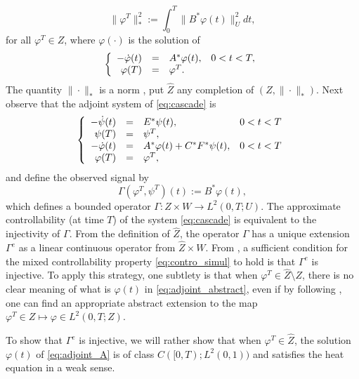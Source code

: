 \documentclass[10pt]{article}
\begin{document}
\begin{equation}\label{eq:obs_norm}
\|\varphi^T\|_*^2 := \int_0^T \|B^*\varphi(t) \|_U^2 dt,
\end{equation}
for all $\varphi^T \in Z$, where $\varphi(\cdot)$ is the solution of 
\begin{equation}\label{eq:adjoint_A}
\left\lbrace \begin{array}{rcl c}
- \dot{\varphi}(t) &=& A^* \varphi(t), & 0 < t < T,\\
\varphi(T) &=& \varphi^T.
\end{array}\right.
\end{equation}
The quantity $\| \cdot \|_*$ is a norm \cite[\S 2.3.2]{Coron}, put $\hat{Z}$ any completion of $(Z,\|\cdot\|_*)$. Next observe that the adjoint system of \eqref{eq:cascade} is
\begin{equation}\label{eq:adjoint_abstract}
\left\lbrace \begin{array}{rcl c}
- \dot{\psi}(t) &=& E^*\psi(t),& 0 < t < T \\
\psi(T) &=& \psi^T, \\
-\dot{\varphi}(t) &=& A^*\varphi(t) + C^*F^*\psi(t), & 0 < t < T\\
\varphi(T) &=& \varphi^T, 
\end{array}\right.
\end{equation}
and define the observed signal by 
\[
\Gamma(\varphi^T, \psi^T)(t) := B^*\varphi(t),
\]
which defines a bounded operator $\Gamma : Z \times W \to L^2(0,T;U)$. The approximate controllability (at time $T$) of the system \eqref{eq:cascade} is equivalent to the injectivity of $\Gamma$. From the definition of $\hat{Z}$, the operator $\Gamma$ has a unique extension $\Gamma^e$ as a linear continuous operator from $\hat{Z} \times W$. From \cite[Proposition 2.4]{lissy_douglas}, a sufficient condition for the mixed controllability property \eqref{eq:contro_simul} to hold is that $\Gamma^e$ is injective. To apply this strategy, one subtlety is that when $\varphi^T \in \hat{Z}\setminus Z$,  there is no clear  meaning of  what is $\varphi(t)$ in \eqref{eq:adjoint_abstract}, even if by following \cite[Proof of Proposition 2.4]{lissy_douglas}, one can find an appropriate abstract extension to the map $\varphi^T \in Z\mapsto \varphi \in L^2(0,T;Z).$

To show that $\Gamma^e$ is injective, we will rather show that when $\varphi^T \in \hat{Z}$, the solution $\varphi(t)$ of \eqref{eq:adjoint_A} is of class $C([0,T);L^2(0,1))$ and satisfies the heat equation in a weak sense. 
\end{document}
